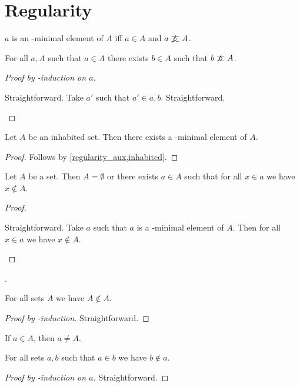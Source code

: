 

\section{Regularity}

\begin{abbreviation}\label{elemminimal}
    $a$ is an \in-minimal element of $A$ iff
    $a\in A$ and $a\mathrel{\not\mathrel{\supset\!\!\!\subset}} A$.
\end{abbreviation}

\begin{lemma}%
\label{regularity_aux}
    For all $a, A$ such that $a\in A$
    there exists $b\in A$ such that
    $b\mathrel{\not\mathrel{\supset\!\!\!\subset}} A$.
\end{lemma}
\begin{proof}[Proof by \in-induction on $a$]
    \begin{byCase}
            Straightforward.
            Take $a'$ such that $a'\in a, b$.
            Straightforward. %
    \end{byCase}
\end{proof}

\begin{proposition}[Regularity]%
\label{regularity}
    Let $A$ be an inhabited set.
    Then there exists a \in-minimal element of $A$.
\end{proposition}
\begin{proof}
    Follows by \cref{regularity_aux,inhabited}.
\end{proof}


\begin{theorem}[Foundation]\label{foundation}
    Let $A$ be a set.
    Then $A = \emptyset$ or there exists $a\in A$
    such that for all $x\in a$ we have $x\notin A$.
\end{theorem}
\begin{proof}
    \begin{byCase}
            Straightforward.
            Take $a$ such that $a$ is a \in-minimal element of $A$.
            Then for all $x\in a$ we have $x\notin A$.
    \end{byCase}
\end{proof}.

\begin{proposition}\label{in_irrefl}
    For all sets $A$ we have $A\not\in A$.
\end{proposition}
\begin{proof}[Proof by \in-induction]
    Straightforward.
\end{proof}

\begin{proposition}\label{in_implies_neq}
    If $a\in A$, then $a\neq A$.
\end{proposition}

\begin{proposition}\label{in_asymmetric}
    For all sets $a, b$ such that $a\in b$ we have $b\notin a$.
\end{proposition}
\begin{proof}[Proof by \in-induction on $a$]
    Straightforward.
\end{proof}
